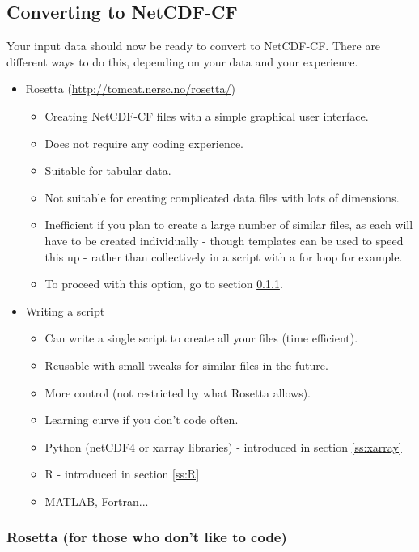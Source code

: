 \documentclass[a4paper,english, 11pt]{article}
\begin{document}
\newpage
\subsection{Converting to NetCDF-CF}
\label{ss:convertingnetcdf}

Your input data should now be ready to convert to NetCDF-CF. There are different ways to do this, depending on your data and your experience.

\begin{itemize}
\item Rosetta (\url{http://tomcat.nersc.no/rosetta/})
\begin{itemize}
\item Creating NetCDF-CF files with a simple graphical user interface. 
\item Does not require any coding experience.
\item Suitable for tabular data.
\item Not suitable for creating complicated data files with lots of dimensions.
\item Inefficient if you plan to create a large number of similar files, as each will have to be created individually - though templates can be used to speed this up - rather than collectively in a script with a for loop for example. 
\item To proceed with this option, go to section \ref{ss:Rosetta}.
\end{itemize}
\item Writing a script
\begin{itemize}
\item Can write a single script to create all your files (time efficient). 
\item Reusable with small tweaks for similar files in the future.
\item More control (not restricted by what Rosetta allows).
\item Learning curve if you don't code often.
\item Python (netCDF4 or xarray libraries) - introduced in section \ref{ss:xarray}
\item R - introduced in section \ref{ss:R}
\item MATLAB, Fortran...   
\end{itemize}
\end{itemize}

\subsubsection{Rosetta (for those who don't like to code)}
\label{ss:Rosetta}
\end{document}
